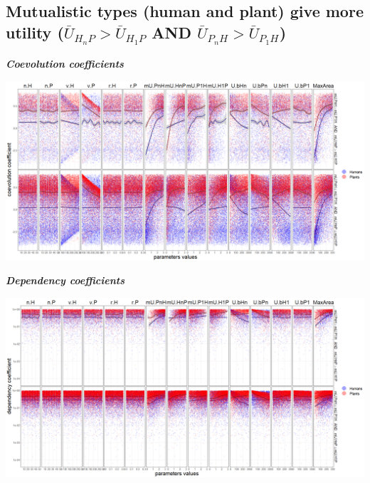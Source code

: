\documentclass[
]{book}
\begin{document}
\newpage

\hypertarget{mutualistic-types-human-and-plant-give-more-utility-baru_h_np-baru_h_1p-and-baru_p_nh-baru_p_1h}{%
\subsection{\texorpdfstring{Mutualistic types (human and plant) give more utility (\(\bar{U}_{H_{n}P}> \bar{U}_{H_{1}P}\) AND \(\bar{U}_{P_{n}H}> \bar{U}_{P_{1}H}\))}{Mutualistic types (human and plant) give more utility (\textbackslash bar\{U\}\_\{H\_\{n\}P\}\textgreater{} \textbackslash bar\{U\}\_\{H\_\{1\}P\} AND \textbackslash bar\{U\}\_\{P\_\{n\}H\}\textgreater{} \textbackslash bar\{U\}\_\{P\_\{1\}H\})}}\label{mutualistic-types-human-and-plant-give-more-utility-baru_h_np-baru_h_1p-and-baru_p_nh-baru_p_1h}}


\textbf{\emph{Coevolution coefficients}}

\includegraphics[width=1\linewidth]{plots/5_multiplePar-coevo-bothImprove-ggplot}

\textbf{\emph{Dependency coefficients}}

\includegraphics[width=1\linewidth]{plots/5_multiplePar-depend-bothImprove-ggplot}
\end{document}
